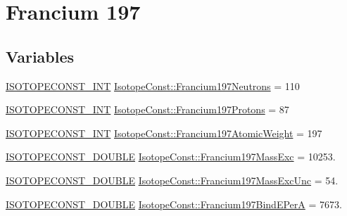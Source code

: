 \hypertarget{group___isotope_const-_francium-_fr197}{}\section{Francium 197}
\label{group___isotope_const-_francium-_fr197}
\subsection*{Variables}
\begin{DoxyCompactItemize}
\item 
\mbox{\hyperlink{group___isotope_const-_macros_ga5f18360b3e99483a35c32d789e62621c}{I\+S\+O\+T\+O\+P\+E\+C\+O\+N\+S\+T\+\_\+\+I\+NT}} \mbox{\hyperlink{group___isotope_const-_francium-_fr197_gaab9926c348397b20c044c12451a51393}{Isotope\+Const\+::\+Francium197\+Neutrons}} = 110
\item 
\mbox{\hyperlink{group___isotope_const-_macros_ga5f18360b3e99483a35c32d789e62621c}{I\+S\+O\+T\+O\+P\+E\+C\+O\+N\+S\+T\+\_\+\+I\+NT}} \mbox{\hyperlink{group___isotope_const-_francium-_fr197_ga27c0e0655bc7c55cc5f9029da25a718e}{Isotope\+Const\+::\+Francium197\+Protons}} = 87
\item 
\mbox{\hyperlink{group___isotope_const-_macros_ga5f18360b3e99483a35c32d789e62621c}{I\+S\+O\+T\+O\+P\+E\+C\+O\+N\+S\+T\+\_\+\+I\+NT}} \mbox{\hyperlink{group___isotope_const-_francium-_fr197_ga9fc9ffa461821a41f2bb06caf10f906d}{Isotope\+Const\+::\+Francium197\+Atomic\+Weight}} = 197
\item 
\mbox{\hyperlink{group___isotope_const-_macros_ga8f45a7272ce02c0b4c65c44636ed719a}{I\+S\+O\+T\+O\+P\+E\+C\+O\+N\+S\+T\+\_\+\+D\+O\+U\+B\+LE}} \mbox{\hyperlink{group___isotope_const-_francium-_fr197_ga01ddf7412a86939dea2f029c7db1dd35}{Isotope\+Const\+::\+Francium197\+Mass\+Exc}} = 10253.
\item 
\mbox{\hyperlink{group___isotope_const-_macros_ga8f45a7272ce02c0b4c65c44636ed719a}{I\+S\+O\+T\+O\+P\+E\+C\+O\+N\+S\+T\+\_\+\+D\+O\+U\+B\+LE}} \mbox{\hyperlink{group___isotope_const-_francium-_fr197_ga7e231ac12df5ba165982027dc38c6af2}{Isotope\+Const\+::\+Francium197\+Mass\+Exc\+Unc}} = 54.
\item 
\mbox{\hyperlink{group___isotope_const-_macros_ga8f45a7272ce02c0b4c65c44636ed719a}{I\+S\+O\+T\+O\+P\+E\+C\+O\+N\+S\+T\+\_\+\+D\+O\+U\+B\+LE}} \mbox{\hyperlink{group___isotope_const-_francium-_fr197_ga7eb23b5382a4f88f46aa47fd8f25fc59}{Isotope\+Const\+::\+Francium197\+Bind\+E\+PerA}} = 7673.
\item 

\end{DoxyCompactItemize}
